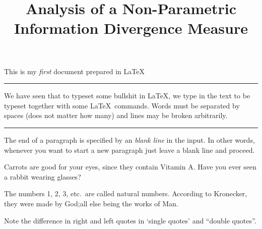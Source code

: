 \documentclass{article}
\begin{document}
\title{Analysis of a Non-Parametric Information Divergence Measure}

This is my \emph{first} document prepared in \LaTeX

\noindent\rule{14cm}{0.4pt}

\noindent We have seen that to typeset some bullshit in \LaTeX, we type in the 
text to be typeset together with some \LaTeX\ commands.
Words must be separated by spaces (does not matter how many)
and lines may be broken arbitrarily.

\noindent\rule{14cm}{0.4pt}

\noindent The end of a paragraph is specified by an \emph{blank line}
in the input. In other words, whenever you want to start a new paragraph just leave a blank line and proceed.

Carrots are good for your eyes, since they contain Vitamin A. Have
you ever seen a rabbit wearing glasses?

The numbers 1, 2, 3, etc.\ are called natural numbers. According to
Kronecker, they were made by God;all else being the works of Man.

Note the difference in right and left quotes in `single quotes'
and ``double quotes''.
\end{document}
